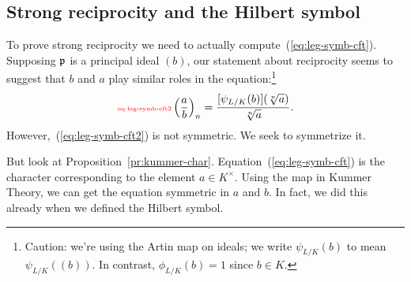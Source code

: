 \subsection{Strong reciprocity and the Hilbert symbol}
To prove strong reciprocity we need to actually compute~(\ref{eq:leg-symb-cft}). Supposing $\mathfrak{p}$ is a principal ideal $(b)$, our statement about reciprocity seems to suggest that $b$ and $a$ play similar roles in the equation:\footnote{Caution: we're using the Artin map on ideals; we write $\psi_{L/K}(b)$ to mean $\psi_{L/K}((b))$. In contrast, $\phi_{L/K}(b)=1$ since $b\in K$.}
\begin{equation}\llabel{eq:leg-symb-cft2}
\pf{a}{b}_n=\fc{[\psi_{L/K}(b)](\sqrt[n]{a})}{\sqrt[n]a}.
\end{equation}
However,~(\ref{eq:leg-symb-cft2}) is not symmetric. We seek to symmetrize it.

But look at Proposition~\ref{pr:kummer-char}. Equation~(\ref{eq:leg-symb-cft}) is the character corresponding to the element $a\in K^{\times}$. Using the map in Kummer Theory, we can get the equation symmetric in $a$ and $b$. In fact, we did this already when we defined the Hilbert symbol.

